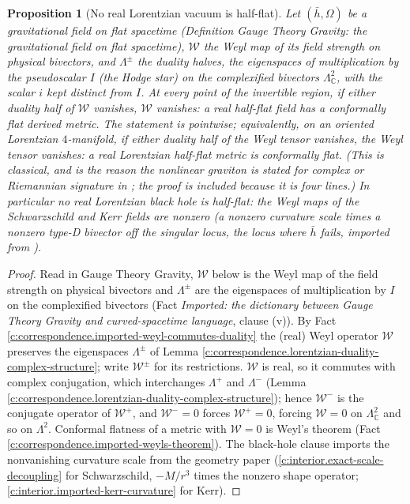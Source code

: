 \documentclass[11pt]{article}
\newtheorem{proposition}[theorem]{Proposition}
\theoremstyle{definition}
\theoremstyle{plain}
\newcommand{\changedmark}[2]{\marginpar{\raggedright\scriptsize\color{#1}#2}}
\providecommand{\C}{}\renewcommand{\C}{\mathbb{C}}
\providecommand{\hb}{}\renewcommand{\hb}{\bar{h}}
\begin{document}
\begin{proposition}[No real Lorentzian vacuum is half-flat]\label{c:correspondence.no-real-lorentzian-vacuum-half-flat}
\changedmark{gray}{reworded}
Let $(\hb, \Omega)$ be a gravitational field on flat spacetime (Definition \emph{Gauge Theory Gravity: the gravitational field on flat spacetime}), $\mathcal{W}$ the Weyl map of its field strength on physical bivectors, and $\Lambda^{\pm}$ the duality halves, the eigenspaces of multiplication by the pseudoscalar $I$ (the Hodge star) on the complexified bivectors $\Lambda^{2}_{\C}$, with the scalar $i$ kept distinct from $I$. At every point of the invertible region, if either duality half of $\mathcal{W}$ vanishes, $\mathcal{W}$ vanishes: a real half-flat field has a conformally flat derived metric. The statement is pointwise; equivalently, on an oriented Lorentzian $4$-manifold, if either duality half of the Weyl tensor vanishes, the Weyl tensor vanishes: a real Lorentzian half-flat metric is conformally flat. (This is classical, and is the reason the nonlinear graviton is stated for complex or Riemannian signature in \cite{Penrose76}; the proof is included because it is four lines.) In particular no real Lorentzian black hole is half-flat: the Weyl maps of the Schwarzschild and Kerr fields are nonzero (a nonzero curvature scale times a nonzero type-D bivector off the singular locus, the locus where $\hb$ fails, imported from \cite[Prop.~3.3, Fact 6.3]{ButlerT6}).
\end{proposition}
\begin{proof}
Read in Gauge Theory Gravity, $\mathcal{W}$ below is the Weyl map of the field strength on physical bivectors and $\Lambda^{\pm}$ are the eigenspaces of multiplication by $I$ on the complexified bivectors (Fact \emph{Imported: the dictionary between Gauge Theory Gravity and curved-spacetime language}, clause (v)). By Fact \ref{c:correspondence.imported-weyl-commutes-duality} the (real) Weyl operator $\mathcal{W}$ preserves the eigenspaces $\Lambda^\pm$ of Lemma \ref{c:correspondence.lorentzian-duality-complex-structure}; write $\mathcal{W}^\pm$ for its restrictions. $\mathcal{W}$ is real, so it commutes with complex conjugation, which interchanges $\Lambda^+$ and $\Lambda^-$ (Lemma \ref{c:correspondence.lorentzian-duality-complex-structure}); hence $\mathcal{W}^-$ is the conjugate operator of $\mathcal{W}^+$, and $\mathcal{W}^- = 0$ forces $\mathcal{W}^+ = 0$, forcing $\mathcal{W} = 0$ on $\Lambda^2_\C$ and so on $\Lambda^2$. Conformal flatness of a metric with $\mathcal{W} = 0$ is Weyl's theorem (Fact \ref{c:correspondence.imported-weyls-theorem}). The black-hole clause imports the nonvanishing curvature scale from the geometry paper (\ref{c:interior.exact-scale-decoupling} for Schwarzschild, $-M/r^3$ times the nonzero shape operator; \ref{c:interior.imported-kerr-curvature} for Kerr).

\end{proof}
\end{document}
